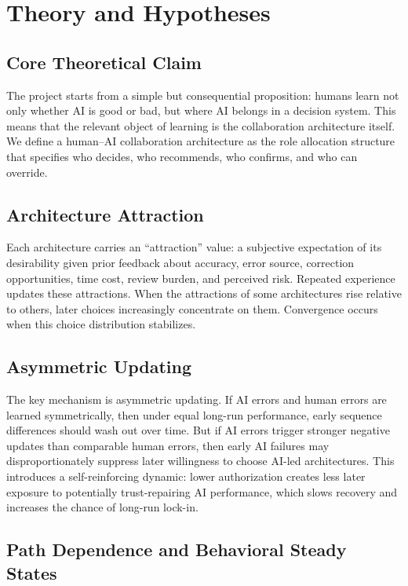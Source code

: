 \section{Theory and Hypotheses}

\subsection{Core Theoretical Claim}

The project starts from a simple but consequential proposition: humans learn not only whether AI is good or bad, but where AI belongs in a decision system. This means that the relevant object of learning is the collaboration architecture itself. We define a human--AI collaboration architecture as the role allocation structure that specifies who decides, who recommends, who confirms, and who can override.

\subsection{Architecture Attraction}

Each architecture carries an ``attraction'' value: a subjective expectation of its desirability given prior feedback about accuracy, error source, correction opportunities, time cost, review burden, and perceived risk. Repeated experience updates these attractions. When the attractions of some architectures rise relative to others, later choices increasingly concentrate on them. Convergence occurs when this choice distribution stabilizes.

\subsection{Asymmetric Updating}

The key mechanism is asymmetric updating. If AI errors and human errors are learned symmetrically, then under equal long-run performance, early sequence differences should wash out over time. But if AI errors trigger stronger negative updates than comparable human errors, then early AI failures may disproportionately suppress later willingness to choose AI-led architectures. This introduces a self-reinforcing dynamic: lower authorization creates less later exposure to potentially trust-repairing AI performance, which slows recovery and increases the chance of long-run lock-in.

\subsection{Path Dependence and Behavioral Steady States}


